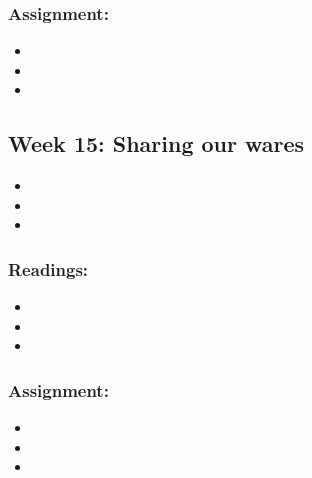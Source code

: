 \documentclass[]{article}
\begin{document}
\subsubsection{Assignment:}\label{assignment-12}

\begin{itemize}
\item
\item
\item
\end{itemize}

\subsection{Week 15: Sharing our wares}\label{week-15-sharing-our-wares}

\begin{itemize}
\item
\item
\item
\end{itemize}

\subsubsection{Readings:}\label{readings-13}

\begin{itemize}
\item
\item
\item
\end{itemize}

\subsubsection{Assignment:}\label{assignment-13}

\begin{itemize}
\item
\item
\item
\end{itemize}
\end{document}
